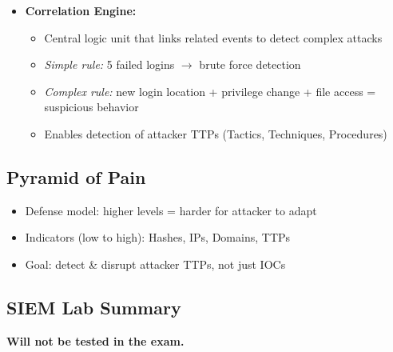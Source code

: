 {\begin{itemize}[noitemsep]
  \item \textbf{Correlation Engine:}
    \begin{itemize}[noitemsep]
      \item Central logic unit that links related events to detect complex attacks
      \item \textit{Simple rule:} 5 failed logins $\rightarrow$ brute force detection
      \item \textit{Complex rule:} new login location + privilege change + file access = suspicious behavior
      \item Enables detection of attacker TTPs (Tactics, Techniques, Procedures)
    \end{itemize}
\end{itemize}
}


\subsection{Pyramid of Pain}
{
\begin{itemize}[noitemsep]
  \item Defense model: higher levels = harder for attacker to adapt
  \item Indicators (low to high): Hashes, IPs, Domains, TTPs
  \item Goal: detect \& disrupt attacker TTPs, not just IOCs
\end{itemize}
}

\subsection{SIEM Lab Summary}
{
\textbf{Will not be tested in the exam.}
}
